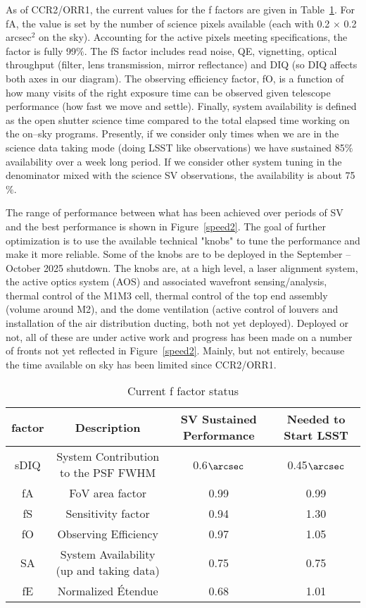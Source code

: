 As of CCR2/ORR1, the current values for the f factors are given in Table~\ref{tab:factors}. For fA, the value is set by the number of science pixels available (each with 0.2 $\times$ 0.2 arcsec$^2$ on the sky). Accounting for the active pixels meeting specifications, the factor is fully 99$\%$. The fS factor includes read noise, QE, vignetting, optical throughput (filter, lens transmission, mirror reflectance) and DIQ (so DIQ affects both axes in our diagram). The observing efficiency factor, fO, is a function of how many visits of the right exposure time can be observed given telescope performance (how fast we move and settle). Finally, system availability is defined as the open shutter science time compared to the total elapsed time working on the on--sky programs. Presently, if we consider only times when we are in the science data taking mode (doing LSST like observations) we have sustained 85$\%$ availability over a week long period. If we consider other system tuning in the denominator mixed with the science SV observations, the availability is about 75$\%$. 

The range of performance between what has been achieved over periods of SV and the best performance is shown in Figure~\ref{speed2}. The goal of further optimization is to use the available technical "knobs" to tune the performance and make it more reliable. Some of the knobs are to be deployed in the September -- October 2025 shutdown. The knobs are, at a high level, a laser alignment system, the active optics system (AOS) and associated wavefront sensing/analysis, thermal control of the M1M3 cell, thermal control of the top end assembly (volume around M2), and the dome ventilation (active control of louvers and installation of the air distribution ducting, both not yet deployed). Deployed or not, all of these are under active work and progress has been made on a number of fronts not yet reflected in Figure~\ref{speed2}. Mainly, but not entirely,  because the time available on sky has been limited since CCR2/ORR1. 

\begin{table}[]
\renewcommand{\arraystretch}{2}
\small
\centering
\caption{Current f factor status}\label{tab:factors}
\begin{tabular}{cccc}
\hline
factor & Description& SV Sustained Performance & Needed to Start LSST \\
\hline \hline
sDIQ & System Contribution to the PSF FWHM  & 0.6$\arcsec$ & 0.45$\arcsec$ \\
fA & FoV area factor & 0.99 & 0.99 \\
fS & Sensitivity factor & 0.94 & 1.30 \\
fO & Observing Efficiency & 0.97 & 1.05 \\
SA & System Availability (up and taking data) & 0.75 & 0.75 \\
fE & Normalized \'{E}tendue & 0.68 & 1.01 \\

\hline
\end{tabular}
\end{table}

